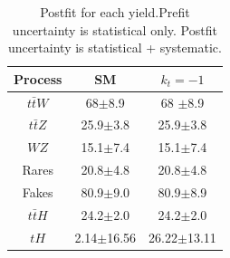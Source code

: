 \begin{table}[ht!]
	\centering
	\caption{Postfit for each yield.Prefit uncertainty is statistical only. Postfit uncertainty is statistical + systematic.}
\begin{tabular}{ccc}
	\hline
	Process  & SM    & $k_t=-1$ \\
	\hline
$t\bar{t}W$  &  68$\pm$8.9& 68 $\pm$8.9 \\
	$t\bar{t}Z$  & 25.9$\pm$3.8&25.9$\pm$3.8\\
$WZ$ &  15.1$\pm$7.4& 15.1$\pm$7.4\\
Rares &  20.8$\pm$4.8& 20.8$\pm$4.8 \\
	Fakes  &  80.9$\pm$9.0&  80.9$\pm$8.9 \\
	$t\bar{t}H$  &   24.2$\pm$2.0 &  24.2$\pm$2.0 \\
\hline
$tH$&  2.14$\pm$16.56 &26.22$\pm$13.11 
\end{tabular}
\label{table1}
\end{table}

